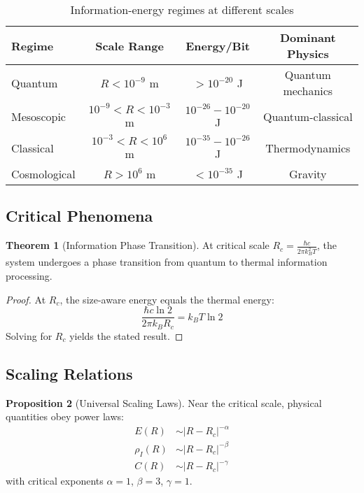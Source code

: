 \documentclass[11pt,a4paper]{article}
\theoremstyle{definition}
\newtheorem{theorem}{Theorem}[section]
\newtheorem{proposition}[theorem]{Proposition}
\begin{document}
\begin{table}[H]
\centering
\begin{tabular}{|l|c|c|c|}
\hline
\textbf{Regime} & \textbf{Scale Range} & \textbf{Energy/Bit} & \textbf{Dominant Physics} \\
\hline
Quantum & $R < 10^{-9}$ m & $> 10^{-20}$ J & Quantum mechanics \\
Mesoscopic & $10^{-9} < R < 10^{-3}$ m & $10^{-26} - 10^{-20}$ J & Quantum-classical \\
Classical & $10^{-3} < R < 10^{6}$ m & $10^{-35} - 10^{-26}$ J & Thermodynamics \\
Cosmological & $R > 10^{6}$ m & $< 10^{-35}$ J & Gravity \\
\hline
\end{tabular}
\caption{Information-energy regimes at different scales}
\end{table}

\subsection{Critical Phenomena}

\begin{theorem}[Information Phase Transition]
At critical scale $R_c = \frac{\hbar c}{2\pi k_B^2 T}$, the system undergoes a phase transition from quantum to thermal information processing.
\end{theorem}

\begin{proof}
At $R_c$, the size-aware energy equals the thermal energy:
\begin{equation}
\frac{\hbar c \ln 2}{2\pi k_B R_c} = k_B T \ln 2
\end{equation}
Solving for $R_c$ yields the stated result.
\end{proof}

\subsection{Scaling Relations}

\begin{proposition}[Universal Scaling Laws]
Near the critical scale, physical quantities obey power laws:
\begin{align}
E(R) &\sim |R - R_c|^{-\alpha} \\
\rho_I(R) &\sim |R - R_c|^{-\beta} \\
C(R) &\sim |R - R_c|^{-\gamma}
\end{align}
with critical exponents $\alpha = 1$, $\beta = 3$, $\gamma = 1$.
\end{proposition}
\end{document}
